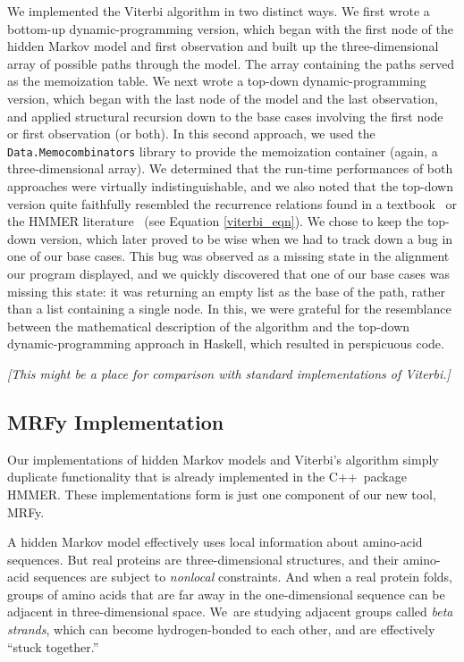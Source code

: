 \documentclass[preprint,nonatbib,blockstyle,nocopyrightspace,times]{sigplanconf}
\let\cite\citep
\begin{document}
We implemented the Viterbi algorithm in two distinct ways.
We first wrote a 
bottom-up dynamic-programming version, which began with the first node of the 
hidden Markov model and first observation and built up the three-dimensional 
array of possible paths through the model.
The array containing the paths 
served as the memoization table.
We next wrote a top-down dynamic-programming 
version, which began with the last node of the model and the last observation, 
and applied structural recursion down to the base cases involving the first 
node or first observation (or both).
In this second approach, we used the 
\texttt{Data.Memocombinators} library to provide the memoization container 
(again, a three-dimensional array).
We determined that the run-time 
performances of both approaches were virtually indistinguishable, and we also 
noted that the top-down version quite faithfully resembled the recurrence 
relations found in a textbook~\cite{Durbin:1998wz} or the HMMER literature~\cite{Eddy:1998ut} 
(see Equation \ref{viterbi_eqn}).
We chose to keep the top-down version, which 
later proved to be wise when we had to track down a bug in one of our base 
cases.
This bug was observed as a missing state in the alignment our program 
displayed, and we quickly discovered that one of our base cases was missing 
this state: it was returning an empty list as the base of the path, rather than 
a list containing a single node.
In this, we were grateful for the resemblance 
between the mathematical description of the algorithm and the top-down 
dynamic-programming approach in Haskell, which resulted in perspicuous code.

\begin{figure}

\end{figure}


\emph{[This might be a place for comparison with standard
implementations of Viterbi.]}



\subsection{MRFy Implementation}

Our implementations of hidden Markov models and Viterbi's algorithm
simply duplicate 
functionality that is already implemented in the C++~package
HMMER.
These implementations form is just one component of our new tool, MRFy.

A hidden Markov model effectively uses local information about
amino-acid sequences.
But real proteins are three-dimensional structures,
and their amino-acid sequences are subject to \emph{nonlocal}
constraints. 
And when a real protein folds, groups of amino acids
that are far away in the one-dimensional sequence can be
adjacent in three-dimensional space.
We~are studying adjacent groups called \emph{beta strands}, which
can become hydrogen-bonded to each other,
and are effectively ``stuck together.''
\end{document}
